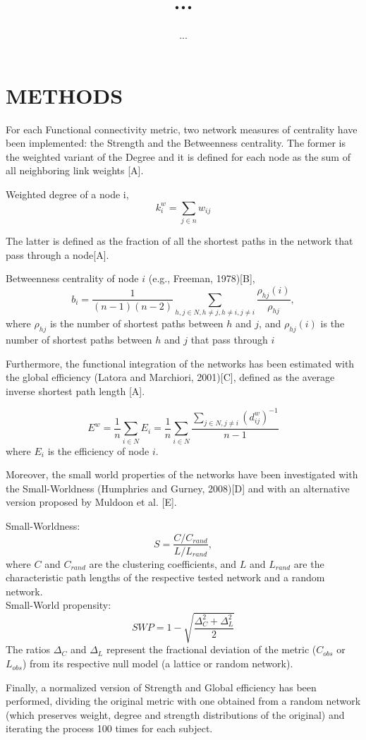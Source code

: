 \documentclass[11pt, a4paper]{article}
\title{...}
\author{...}
\begin{document}
\maketitle

\section{METHODS}
For each Functional connectivity metric, two network measures of centrality have been implemented: the Strength and the Betweenness centrality. The former is the weighted variant of the Degree and it is defined for each node as the sum of all neighboring link weights [A].
\begin{center}
	Weighted degree of a node i,
$$k_{i}^{w} = \sum_{j\in n}w_{ij}$$
\end{center}
The latter is defined as the fraction of all the shortest paths in the network that pass through a node[A].\begin{center}
	Betweenness centrality of node $ i $ (e.g., Freeman, 1978)[B],
$$b_{i} = \frac{1}{(n - 1)(n - 2)}\sum_{h,j\in N, h \neq j,h \neq i,j \neq i}\frac{\rho_{hj}(i)}{\rho_{hj}},$$
where $\rho_{hj}$ is the number of shortest paths between $ h $ and $ j $, and $\rho_{hj}(i)$ is the number of shortest paths between $ h $ and $ j $ that pass through $ i $
\end{center}
Furthermore, the functional integration of the networks has been estimated with the global efficiency (Latora and Marchiori, 2001)[C], defined as the average inverse shortest path length [A]. 
\begin{center}
$$E^{w} = \frac{1}{n}\sum_{i \in N} E_{i} = \frac{1}{n}\sum_{i \in N}\frac{\sum_{j \in N, j \neq i}(d_{ij}^{w})^{-1}}{n-1}$$
where $ E_{i} $ is the efficiency of node $ i $.
\end{center}
Moreover, the small world properties of the networks have been investigated with the Small-Worldness (Humphries and Gurney, 2008)[D] and with an alternative version proposed by Muldoon et al. [E].
\begin{center}
	Small-Worldness: $$S = \frac{C/C_{rand}}{L/L_{rand}},$$
where $ C $ and $ C_{rand} $ are the clustering coefficients, and $ L $ and $ L_{rand} $ are
the characteristic path lengths of the respective tested network and
a random network.\\
Small-World propensity:
$$SWP = 1 - \sqrt{\frac{\Delta_{C}^{2} + \Delta_{L}^{2}}{2}}$$
The ratios $ \Delta_{C} $ and $ \Delta_{L} $ represent the fractional deviation of the metric ($ C_{obs} $ or $ L_{obs} $) from its respective null model (a lattice or random network).
\end{center}
Finally, a normalized version of Strength and Global efficiency has been performed, dividing the original metric with one  obtained from a random network (which preserves weight, degree and strength distributions of the original) and iterating the process 100 times for each subject.
\end{document}
